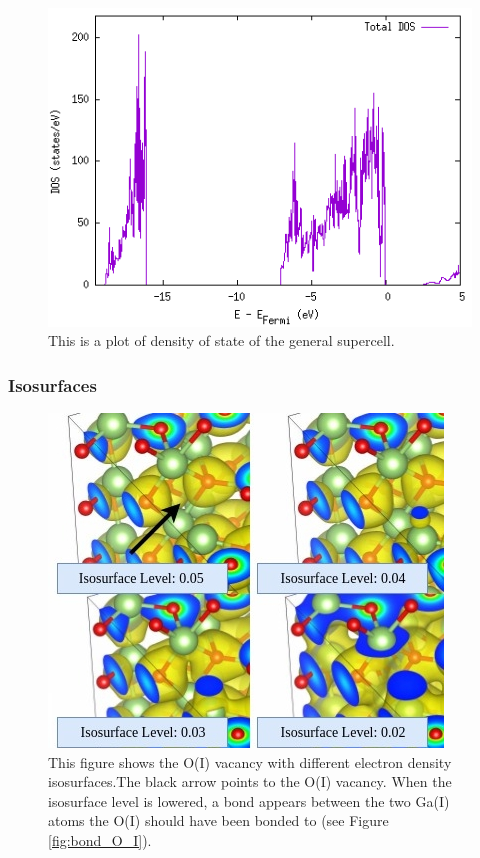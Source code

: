 \begin{figure}[H]
\includegraphics[width=\linewidth]{../fig/dosplot/total_dos_supercell}\caption{This is a plot of density of state of the general supercell.}\label{fig:total_dos_supercell}
\end{figure}

\subsubsection{Isosurfaces}

\begin{figure}[H]
\includegraphics[width=0.9\linewidth]{../fig/isosurfaces/O_I/isosurface}\caption{This figure shows the O(I) vacancy with different electron density isosurfaces.The black arrow points to the O(I) vacancy. When the isosurface level is lowered, a bond appears between the two Ga(I) atoms the O(I) should have been bonded to (see Figure \ref{fig:bond_O_I}).}\label{fig:isosurface_O_I}
\end{figure}

